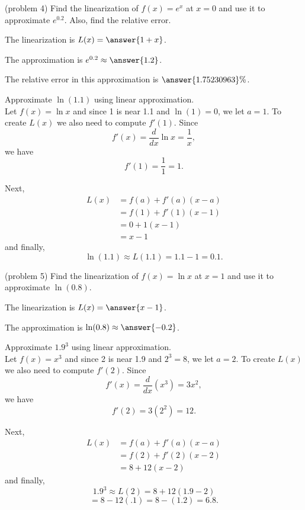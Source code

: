 \documentclass{ximera}
\begin{document}
 
 
 

\begin{problem}(problem 4)
Find the linearization of $f(x) = e^x$ at $x = 0$ and use it to approximate $e^{0.2}$.
Also, find the relative error.

The linearization is  $L(x) = \answer{1 + x}$.

The approximation is $e^{0.2} \approx \answer{1.2}$.

The relative error in this approximation is $\answer{1.75230963}\%$.


\end{problem}

\begin{example}[example 5]
Approximate $\ln(1.1)$ using linear approximation.\\ 
Let $f(x) = \ln x$ and since 1 is near 1.1 and $\ln(1) = 0$, we let 
$a = 1$. To create $L(x)$ we also need to compute $f'(1)$. 
Since 
\[f'(x) = \frac{d}{dx} \ln x = \frac{1}{x},\] 
we have
\[f'(1) = \frac{1}{1} = 1.\]

Next, 
\begin{align*}
L(x) &= f(a) + f'(a)(x - a) \\
&= f(1) + f'(1)(x - 1) \\
&= 0 + 1(x - 1)\\
&=x-1
\end{align*}
and finally,
\[\ln(1.1) \approx L(1.1) = 1.1 - 1 = 0.1.\]


\end{example}

\begin{problem}(problem 5)
Find the linearization of $f(x) = \ln x$ at $x = 1$ and use it to approximate $\ln(0.8)$.

The linearization is  $L(x) = \answer{x-1}$.

The approximation is $\ln(0.8) \approx \answer{-0.2}$.
\end{problem}

\begin{example}[example 6]
Approximate $1.9^3$ using linear approximation.\\ 
Let $f(x) = x^3$ and since 2 is near 1.9 and $2^3 = 8$, we let 
$a = 2$. To create $L(x)$ we also need to compute $f'(2)$. 
Since 
\[f'(x) = \frac{d}{dx} (x^3) = 3x^2,\] 
we have
\[f'(2) = 3(2^2) = 12.\]

Next, 
\begin{align*}
L(x) &= f(a) + f'(a)(x - a) \\
&= f(2) + f'(2)(x - 2) \\
&= 8 + 12(x - 2)
\end{align*}
and finally,
\[1.9^3 \approx L(2) = 8 + 12(1.9 - 2) \]
\[= 8 - 12(.1) = 8-(1.2) = 6.8.\]
\end{example}
\end{document}
